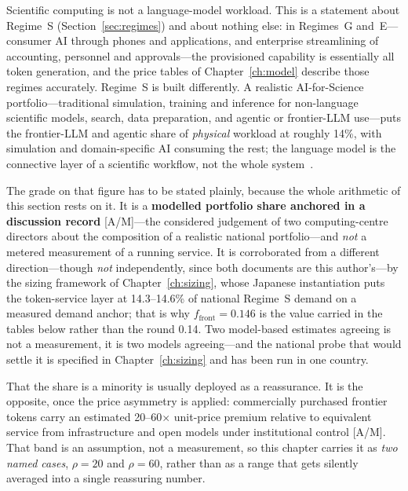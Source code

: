 Scientific computing is not a language-model workload. This is a statement about Regime~S (Section~\ref{sec:regimes}) and about nothing else: in Regimes~G and~E---consumer AI through phones and applications, and enterprise streamlining of accounting, personnel and approvals---the provisioned capability is essentially all token generation, and the price tables of Chapter~\ref{ch:model} describe those regimes accurately. Regime~S is built differently. A realistic AI-for-Science portfolio---traditional simulation, training and inference for non-language scientific models, search, data preparation, and agentic or frontier-LLM use---puts the frontier-LLM and agentic share of \emph{physical} workload at roughly 14\%, with simulation and domain-specific AI consuming the rest; the language model is the connective layer of a scientific workflow, not the whole system~\cite{consortium-record}.

The grade on that figure has to be stated plainly, because the whole arithmetic of this section rests on it. It is a \textbf{modelled portfolio share anchored in a discussion record} [A/M]---the considered judgement of two computing-centre directors about the composition of a realistic national portfolio---and \emph{not} a metered measurement of a running service. It is corroborated from a different direction---though \emph{not} independently, since both documents are this author's---by the sizing framework of Chapter~\ref{ch:sizing}, whose Japanese instantiation puts the token-service layer at 14.3--14.6\% of national Regime~S demand on a measured demand anchor; that is why $f_{\mathrm{front}} = 0.146$ is the value carried in the tables below rather than the round 0.14. Two model-based estimates agreeing is not a measurement, it is two models agreeing---and the national probe that would settle it is specified in Chapter~\ref{ch:sizing} and has been run in one country.

That the share is a minority is usually deployed as a reassurance. It is the opposite, once the price asymmetry is applied: commercially purchased frontier tokens carry an estimated 20--60$\times$ unit-price premium relative to equivalent service from infrastructure and open models under institutional control [A/M]. That band is an assumption, not a measurement, so this chapter carries it as \emph{two named cases}, $\rho = 20$ and $\rho = 60$, rather than as a range that gets silently averaged into a single reassuring number.

